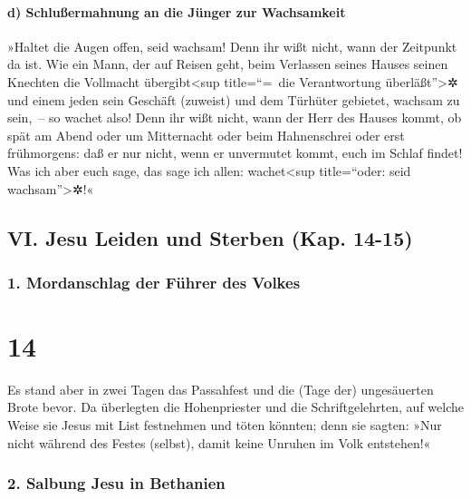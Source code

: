 \hypertarget{d-schluuxdfermahnung-an-die-juxfcnger-zur-wachsamkeit}{%
\paragraph{d) Schlußermahnung an die Jünger zur
Wachsamkeit}\label{d-schluuxdfermahnung-an-die-juxfcnger-zur-wachsamkeit}}

 »Haltet die Augen offen, seid wachsam! Denn ihr wißt
nicht, wann der Zeitpunkt da ist.  Wie ein Mann, der auf
Reisen geht, beim Verlassen seines Hauses seinen Knechten die Vollmacht
übergibt\textless sup title=``=~die Verantwortung
überläßt''\textgreater✲ und einem jeden sein Geschäft (zuweist) und dem
Türhüter gebietet, wachsam zu sein,~--  so wachet also!
Denn ihr wißt nicht, wann der Herr des Hauses kommt, ob spät am Abend
oder um Mitternacht oder beim Hahnenschrei oder erst frühmorgens:
 daß er nur nicht, wenn er unvermutet kommt, euch im
Schlaf findet!  Was ich aber euch sage, das sage ich
allen: wachet\textless sup title=``oder: seid wachsam''\textgreater✲!«

\hypertarget{vi.-jesu-leiden-und-sterben-kap.-14-15}{%
\subsection{VI. Jesu Leiden und Sterben (Kap.
14-15)}\label{vi.-jesu-leiden-und-sterben-kap.-14-15}}

\hypertarget{mordanschlag-der-fuxfchrer-des-volkes}{%
\subsubsection{1. Mordanschlag der Führer des
Volkes}\label{mordanschlag-der-fuxfchrer-des-volkes}}

\hypertarget{section-13}{%
\section{14}\label{section-13}}

 Es stand aber in zwei Tagen das Passahfest und die (Tage
der) ungesäuerten Brote bevor. Da überlegten die Hohenpriester und die
Schriftgelehrten, auf welche Weise sie Jesus mit List festnehmen und
töten könnten;  denn sie sagten: »Nur nicht während des
Festes (selbst), damit keine Unruhen im Volk entstehen!«

\hypertarget{salbung-jesu-in-bethanien}{%
\subsubsection{2. Salbung Jesu in
Bethanien}\label{salbung-jesu-in-bethanien}}

